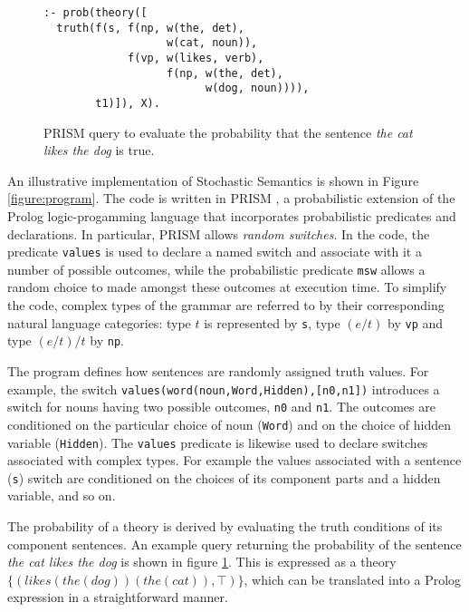\documentclass[a4paper,11pt]{article}
\renewcommand{\cite}{\citep}
\theoremstyle{definition}
\newcommand{\hide}[1]{}
\begin{document}
\begin{figure}
\begin{lstlisting}
:- prob(theory([
  truth(f(s, f(np, w(the, det),
                   w(cat, noun)),
             f(vp, w(likes, verb),
                   f(np, w(the, det),
                         w(dog, noun)))),
        t1)]), X).
\end{lstlisting}
\caption{PRISM query to evaluate the probability that the sentence
  \emph{the cat likes the dog} is true.}
\label{figure:query}
\end{figure}




An illustrative implementation of Stochastic Semantics is shown in Figure \ref{figure:program}. The code is written in PRISM  \cite{Sato:97}, a probabilistic extension of the Prolog logic-progamming language that incorporates probabilistic predicates and declarations. In particular, PRISM allows {\em random switches}. In the code, the predicate \texttt{values} is used to declare a named switch and associate with it a number of possible outcomes, while the probabilistic predicate \texttt{msw} allows a random choice to made amongst these outcomes at execution time. To simplify the code, complex types of the grammar are referred to by their corresponding natural language
categories: type $t$ is represented by \texttt{s}, type $(e/t)$ by \texttt{vp} and type $(e/t)/t$ by \texttt{np}. 

The program defines how sentences are randomly assigned truth values. For example, the switch
\texttt{values(word(noun,Word,Hidden),[n0,n1])} 
introduces a switch for nouns having two possible outcomes, \texttt{n0} and \texttt{n1}.
The outcomes are conditioned on the particular choice of noun (\texttt{Word}) and on the choice of hidden variable (\texttt{Hidden}). The \texttt{values} predicate is likewise used to declare switches associated with complex types. For example the values associated with a sentence (\texttt{s}) switch are conditioned on the choices of its component parts and a hidden variable, and so on.

The probability of a theory is derived by evaluating the truth
conditions of its component sentences.
An example query returning the
probability of the sentence {\em the cat likes the dog\/} is shown in
figure \ref{figure:query}. This is expressed as a theory
$\{(\mathit{likes}(\mathit{the}(\mathit{dog}))(\mathit{the}(\mathit{cat})),\top)\}$,
which can be translated into a Prolog expression in a straightforward
manner.
\end{document}
